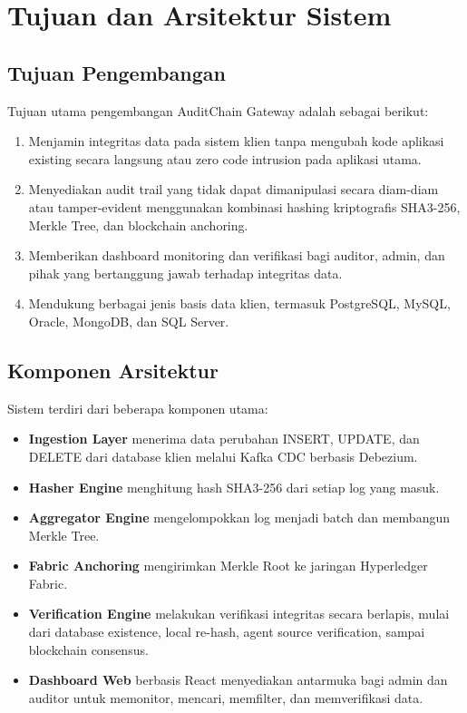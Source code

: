 \chapter{Tujuan dan Arsitektur Sistem}

\section{Tujuan Pengembangan}

Tujuan utama pengembangan AuditChain Gateway adalah sebagai berikut:

\begin{enumerate}
    \item Menjamin integritas data pada sistem klien tanpa mengubah kode aplikasi existing secara langsung atau zero code intrusion pada aplikasi utama.
    \item Menyediakan audit trail yang tidak dapat dimanipulasi secara diam-diam atau tamper-evident menggunakan kombinasi hashing kriptografis SHA3-256, Merkle Tree, dan blockchain anchoring.
    \item Memberikan dashboard monitoring dan verifikasi bagi auditor, admin, dan pihak yang bertanggung jawab terhadap integritas data.
    \item Mendukung berbagai jenis basis data klien, termasuk PostgreSQL, MySQL, Oracle, MongoDB, dan SQL Server.
\end{enumerate}

\section{Komponen Arsitektur}

Sistem terdiri dari beberapa komponen utama:

\begin{itemize}
    \item \textbf{Ingestion Layer} menerima data perubahan INSERT, UPDATE, dan DELETE dari database klien melalui Kafka CDC berbasis Debezium.
    \item \textbf{Hasher Engine} menghitung hash SHA3-256 dari setiap log yang masuk.
    \item \textbf{Aggregator Engine} mengelompokkan log menjadi batch dan membangun Merkle Tree.
    \item \textbf{Fabric Anchoring} mengirimkan Merkle Root ke jaringan Hyperledger Fabric.
    \item \textbf{Verification Engine} melakukan verifikasi integritas secara berlapis, mulai dari database existence, local re-hash, agent source verification, sampai blockchain consensus.
    \item \textbf{Dashboard Web} berbasis React menyediakan antarmuka bagi admin dan auditor untuk memonitor, mencari, memfilter, dan memverifikasi data.
\end{itemize}

